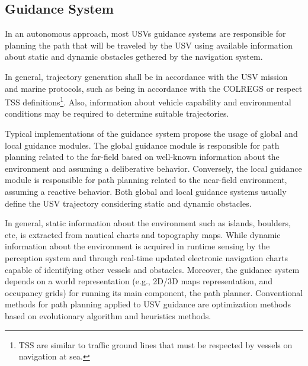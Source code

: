     \subsection{Guidance System}

    In an autonomous approach, most \acp{USV} guidance systems are responsible for planning the path that will be traveled by the \ac{USV} using available information about static and dynamic obstacles gethered by the navigation system.

    In general, trajectory generation shall be in accordance with the \ac{USV} mission and marine protocols, such as being in accordance with the \ac{COLREGS} or respect \ac{TSS} definitions\footnote{\ac{TSS} are similar to traffic ground lines that must be respected by vessels on navigation at sea.}. Also, information about vehicle capability and environmental conditions may be required to determine suitable trajectories.
    
    Typical implementations of the guidance system propose the usage of global and local guidance modules. The global guidance module is responsible for path planning related to the far-field based on well-known information about the environment and assuming a deliberative behavior. Conversely, the local guidance module is responsible for path planning related to the near-field environment, assuming a reactive behavior. Both global and local guidance systems usually define the \ac{USV} trajectory considering static and dynamic obstacles.
    
    In general, static information about the environment such as islands, boulders, etc, is extracted from nautical charts and topography maps. While dynamic information about the environment is acquired in runtime sensing by the perception system and through real-time updated electronic navigation charts capable of identifying other vessels and obstacles. Moreover, the guidance system depends on a world representation (e.g., 2D/3D maps representation, and occupancy grids) for running its main component, the path planner. Conventional methods for path planning applied to \ac{USV} guidance are optimization methods based on evolutionary algorithm and heuristics methods.

